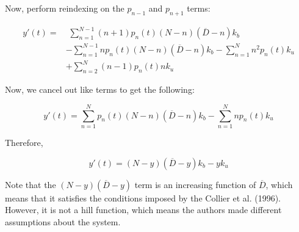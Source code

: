 \documentclass{article}
\begin{document}
\begin{flushleft}
Now, perform reindexing on the $p_{n- 1}$ and $p_{n+1}$ terms:

$$
\begin{aligned}
y'(t) = &\,\,\sum_{n = 1}^{N - 1} (n + 1)p_{n}(t)(N - n) (\overline{D} - n)k_{b} \\[5pt]
        &-  \sum_{n = 1}^{N - 1} np_{n}(t) (N - n)(\overline{D} - n)k_{b} -  \sum_{n = 1}^{N}  n^2 p_{n}(t) k_{u} \\[5pt]
        &+  \sum_{n = 2}^{N}  (n - 1 )p_{n}(t) nk_{u} 
\end{aligned}
$$

Now, we cancel out like terms to get the following:

$$
y'(t) = \sum_{n = 1}^{N} p_{n}(t)(N - n)(\overline{D} - n)k_{b} - \sum_{n = 1}^{N} np_{n}(t)  k_{u}
$$

Therefore, 

$$
y'(t) = (N - y)(\overline{D} - y)k_{b} -  yk_{u}
$$

Note that the $(N - y)(\overline{D} - y)$ term is an increasing function of $\overline{D}$, which means that it satisfies the conditions imposed by the Collier et al. (1996). However, it is not a hill function, which means the authors made different assumptions about the system.

\end{flushleft}
\end{document}

